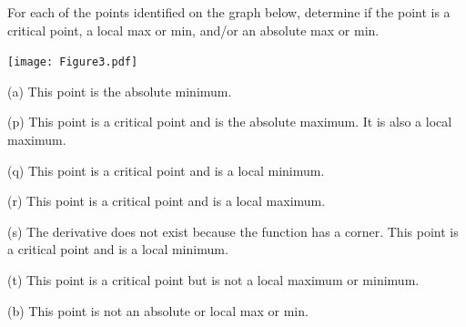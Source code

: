 \documentclass[nooutcomes]{ximera}
\begin{document}
\begin{problem}
For each of the points identified on the graph below, determine if the point is a critical point, a local max or min, and/or an absolute max or min.

	\begin{center}
	\begin{image}
	\texttt{[image: Figure3.pdf]}
	\end{image}
	\end{center}	
	
		\begin{freeResponse}
(a) This point is the absolute minimum.

(p) This point is a critical point and is the absolute maximum.  It is also a local maximum.

(q) This point is a critical point and is a local minimum.

(r) This point is a critical point and is a local maximum.

(s) The derivative does not exist because the function has a corner.  This point is a critical point and is a local minimum.

(t) This point is a critical point but is not a local maximum or minimum.

(b) This point is not an absolute or local max or min.
		\end{freeResponse}	
		
\end{problem}
\end{document}
